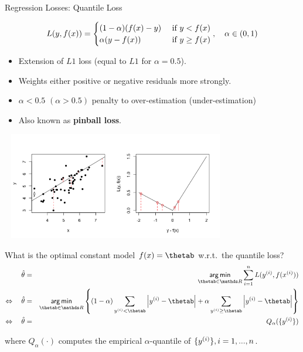 \begin{vbframe}{Regression Losses: Quantile Loss}
\vspace{-0.3cm}

\small
$$
L(y, f(x)) = \begin{cases} (1 - \alpha) (f(x) - y) & \text{ if } y < f(x)\\
\alpha (y - f(x)) & \text{ if } y \ge f(x)
\end{cases}, \quad \alpha \in (0, 1)
$$


\normalsize
\begin{itemize}
\item Extension of $L1$ loss (equal to $L1$ for $\alpha = 0.5$).
\item Weights either positive or negative residuals more strongly. 
\item $\alpha<0.5$ $(\alpha>0.5)$ penalty to over-estimation (under-estimation)
\item Also known as \textbf{pinball loss}.
\end{itemize}

\vspace*{-0.5cm}

\begin{center}
\includegraphics[width = 10cm, height = 4.7cm]{figure_man/2_3_loss_pinball_plot2.png}
\end{center}

\framebreak

What is the optimal constant model $\fx = \thetab$ w.r.t.\ the quantile loss?
\vspace{-0.2cm}
\begin{eqnarray*}
\thetah&=& \argmin_{\thetab\in \R}\sumin \Lxyi \\
\Leftrightarrow\quad 
\thetah &=& \argmin_{\thetab \in \R}\left\{ (1 - \alpha) \sum_{\yi<\thetab}  \left|\yi-\thetab\right| + \alpha \sum_{\yi \geq\thetab}  \left|\yi-\thetab\right|\right\} \\
\Leftrightarrow\quad \thetah &=& Q_\alpha(\{\yi\})
\end{eqnarray*}

where $Q_\alpha(\cdot)$ computes the empirical $\alpha$-quantile of $\{y^{(i)}\}, i = 1, ..., n$.


\end{vbframe}

